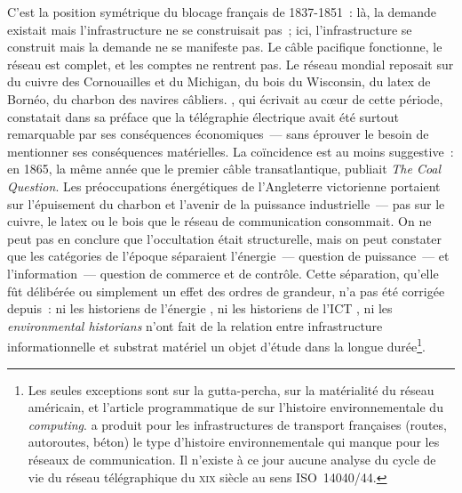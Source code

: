C'est la position symétrique du blocage français de 1837-1851~: là, la demande existait mais l'infrastructure ne se construisait pas~; ici, l'infrastructure se construit mais la demande ne se manifeste pas. Le câble pacifique fonctionne, le réseau est complet, et les comptes ne rentrent pas. Le réseau mondial reposait sur du cuivre des Cornouailles et du Michigan, du bois du Wisconsin, du latex de Bornéo, du charbon des navires câbliers. \textcite{belloc_telegraphie_1894}, qui écrivait au c\oe{}ur de cette période, constatait dans sa préface que la télégraphie électrique avait été \og surtout remarquable par ses conséquences économiques\fg{}~--- sans éprouver le besoin de mentionner ses conséquences matérielles. La coïncidence est au moins suggestive~: en 1865, la même année que le premier câble transatlantique, \textcite{jevons_coal_1865} publiait \emph{The Coal Question}. Les préoccupations énergétiques de l'Angleterre victorienne portaient sur l'épuisement du charbon et l'avenir de la puissance industrielle~--- pas sur le cuivre, le latex ou le bois que le réseau de communication consommait. On ne peut pas en conclure que l'occultation était structurelle, mais on peut constater que les catégories de l'époque séparaient l'énergie~--- question de puissance~--- et l'information~--- question de commerce et de contrôle. Cette séparation, qu'elle fût délibérée ou simplement un effet des ordres de grandeur, n'a pas été corrigée depuis~: ni les historiens de l'énergie \parencite{smil2017energy, wrigley2010energy}, ni les historiens de l'ICT \parencite{headrick_invisible_1991, standage1998victorian}, ni les \emph{environmental historians} n'ont fait de la relation entre infrastructure informationnelle et substrat matériel un objet d'étude dans la longue durée\footnote{Les seules exceptions sont \textcite{tully_victorian_2009} sur la gutta-percha, \textcite{fitzmaurice_material_2023} sur la matérialité du réseau américain, et l'article programmatique de \textcite{ensmenger_environmental_2018} sur l'histoire environnementale du \emph{computing}. \textcite{magalhaes_accumuler_2024} a produit pour les infrastructures de transport françaises (routes, autoroutes, béton) le type d'histoire environnementale qui manque pour les réseaux de communication. Il n'existe à ce jour aucune analyse du cycle de vie du réseau télégraphique du \textsc{xix}\ieme{} siècle au sens ISO~14040/44.}.


